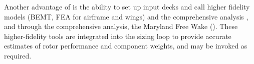 \vspace{1cm}
Another advantage of \hydra \spc is the ability to set up input decks and call higher fidelity models (BEMT, FEA for airframe and wings) and the comprehensive analysis , and through the comprehensive analysis, the Maryland Free Wake (). These higher-fidelity tools are integrated into the sizing loop to provide accurate estimates of rotor performance and component weights, and may be invoked as required.

